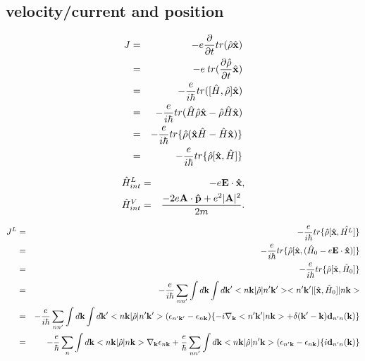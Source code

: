 \documentclass[aps,prb,preprint]{revtex4-1}
\begin{document}
\begin{appendix}
\section{velocity/current and position}
\begin{eqnarray}
J &=&  -e\frac{\partial}{\partial t} tr(\hat{\rho}\hat{\bf x}) \nonumber \\
&=&  -e\: tr(\frac{\partial \hat{\rho} }{\partial t}\hat{\bf x}) \nonumber \\
&=&  -\frac{e}{i \hbar} tr([\hat{H}, \hat{\rho}] \hat{\bf x}) \nonumber \\
&=&  -\frac{e}{i \hbar} tr(\hat{H}\hat{\rho}\hat{\bf x}-\hat{\rho}\hat{H}\hat{\bf x}) \nonumber \\
&=&  -\frac{e}{i \hbar} tr\{\hat{\rho}(\hat{\bf x}\hat{H}-\hat{H}\hat{\bf x})\} \nonumber \\
&=&  -\frac{e}{i \hbar} tr\{\hat{\rho}[\hat{\bf x},\hat{H}]\} \nonumber \\
\end{eqnarray} 

 \begin{eqnarray}
 \hat{H}^{L}_{int} &=&  -e{\bf E} \cdot {\bf \hat{x}}, \\
 \hat{H}^{V}_{int} &=& \frac{- 2e{\bf A} \cdot {\bf \hat{p}} + e^2 |{\bf A}|^2}{2m}. 
\end{eqnarray}

\begin{eqnarray}
J^L&=&  -\frac{e}{i \hbar} tr\{\hat{\rho}[\hat{\bf x},\hat{H^L} ]\} \nonumber \\
&=&  -\frac{e}{i \hbar} tr\{\hat{\rho}[\hat{\bf x},(\hat{H}_0 -e{\bf E} \cdot {\bf \hat{x}} )]\} \nonumber \\
&=&  -\frac{e}{i \hbar} tr\{\hat{\rho}[\hat{\bf x},\hat{H}_0]\} \nonumber \\
&=&   -\frac{e}{i \hbar} \sum_{nn'}\int d{\bf k} \int d{\bf k'} <n{\bf k}|\hat{\rho}|n'{\bf k'}><n'{\bf k'}|[\hat{\bf x},\hat{H}_0]|n{\bf k}> \nonumber \\
&=&   -\frac{e}{i \hbar} \sum_{nn'}\int d{\bf k} \int d{\bf k'} <n{\bf k}|\hat{\rho}|n'{\bf k'}>(\epsilon_{n'{\bf k'}}-\epsilon_{n{\bf k}})\{-i\nabla_{\bf k} <n'{\bf k'}|n{\bf k}> +  \delta({\bf k'-k}) {\bf d}_{n'n}({\bf k})\} \nonumber \\
&=&  -\frac{e}{\hbar} \sum_{n} \int d{\bf k} <n{\bf k}|\hat{\rho}|n{\bf k}> \nabla_{\bf k} \epsilon_{n{\bf k}}  + \frac{e}{\hbar} \sum_{nn'} \int d{\bf k} <n{\bf k}|\hat{\rho}|n'{\bf k}> (\epsilon_{n'{\bf k}}-\epsilon_{n{\bf k}}) \{i {\bf d}_{n'n}({\bf k})\}\nonumber \\
\end{eqnarray} 


\end{appendix}
\end{document}
